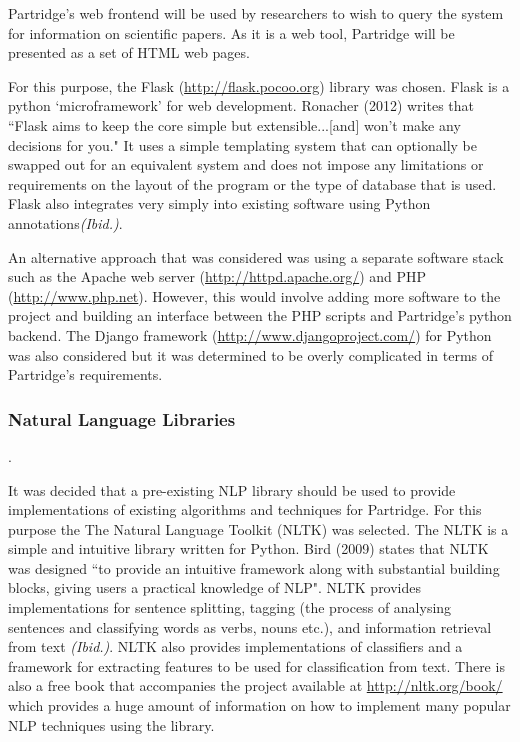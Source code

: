 \documentclass[12pt,a4paper]{article}
\begin{document}
Partridge's web frontend will be used by researchers to wish to query the
system for information on scientific papers. As it is a web tool, Partridge
will be presented as a set of HTML web pages.

For this purpose, the Flask (\url{http://flask.pocoo.org}) library was chosen.
Flask is a python `microframework' for web development. Ronacher (2012) writes
that ``Flask aims to keep the core simple but extensible...[and] won't make any
decisions for you\cite{flask2012}." It uses a simple templating system that can
optionally be swapped out for an equivalent system and does not impose any
limitations or requirements on the layout of the program or the type of
database that is used. Flask also integrates very simply into existing software
using Python annotations\emph{(Ibid.)}. 

An alternative approach that was considered was using a separate software
stack such as the Apache web server (\url{http://httpd.apache.org/}) and PHP 
(\url{http://www.php.net}). However, this would involve adding more software to the
project and building an interface between the PHP scripts and Partridge's
python backend. The Django framework (\url{http://www.djangoproject.com/}) for Python was also
considered but it was determined to be overly complicated in terms of
Partridge's requirements.

\subsubsection{Natural Language Libraries} \label{sec:libschoice}.  

It was decided that a pre-existing NLP library should be used to provide
implementations of existing algorithms and techniques for Partridge. For this
purpose the The Natural Language Toolkit (NLTK) was selected. The NLTK is a
simple and intuitive library written for Python. Bird (2009) states that NLTK
was designed ``to provide an intuitive framework along with substantial
building blocks, giving users a practical knowledge of
NLP\cite{bird2009natural}". NLTK provides implementations for sentence
splitting, tagging (the process of analysing sentences and classifying words as
verbs, nouns etc.), and information retrieval from text \emph{(Ibid.)}. NLTK
also provides implementations of classifiers and a framework for extracting
features to be used for classification from text. There is also a free book
that accompanies the project available at \url{http://nltk.org/book/} which
provides a huge amount of information on how to implement many popular NLP
techniques using the library.
\end{document}
